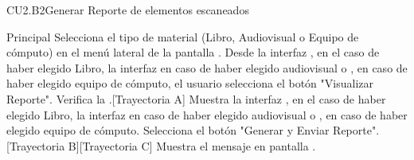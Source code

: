 \begin{UseCase}{CU2.B2}{Generar Reporte de elementos escaneados}
{\begin{itemize}
			\end{itemize}				
		}

	\end{UseCase}
	\begin{UCtrayectoria}{Principal}
	\UCpaso[\UCactor] Selecciona el tipo de material (Libro, Audiovisual o Equipo de cómputo) en el menú lateral de la pantalla .
	 \UCpaso[\UCactor]Desde la interfaz , en el caso de haber elegido Libro, la interfaz  en caso de haber elegido audiovisual o , en caso de haber elegido equipo de cómputo, el usuario selecciona el botón "Visualizar Reporte".
	   \UCpaso[\UCsist] Verifica la  .[Trayectoria A]
	   \UCpaso[\UCsist]Muestra la interfaz , en el caso de haber elegido Libro, la interfaz  en caso de haber elegido audiovisual o , en caso de haber elegido equipo de cómputo.
	    \UCpaso[\UCactor] Selecciona el botón "Generar y Enviar Reporte". [Trayectoria B][Trayectoria C]
	    \UCpaso[\UCsist] Muestra el mensaje en pantalla .
	\end{UCtrayectoria}

